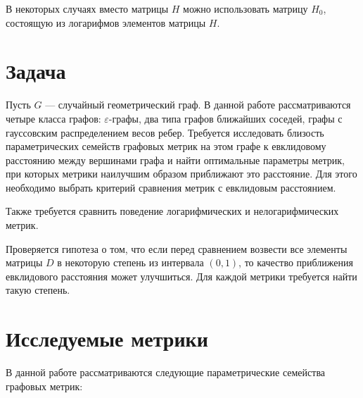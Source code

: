 В некоторых случаях вместо матрицы $H$ можно использовать матрицу $H_0$, состоящую из логарифмов элементов матрицы $H$.


\clearpage

\section{Задача} \label{sect1_2}

Пусть $G$ --- случайный геометрический граф. В данной работе рассматриваются четыре класса графов: $\varepsilon$-графы, два типа графов ближайших соседей, графы с гауссовским распределением весов ребер. Требуется исследовать близость параметрических семейств графовых метрик на этом графе к евклидовому расстоянию между вершинами графа и найти оптимальные параметры метрик, при которых метрики наилучшим образом приближают это расстояние. Для этого необходимо выбрать критерий сравнения метрик с евклидовым расстоянием.

Также требуется сравнить поведение логарифмических и нелогарифмических метрик.

Проверяется гипотеза о том, что если перед сравнением возвести все элементы матрицы $D$ в некоторую степень из интервала $(0,1)$, то качество приближения евклидового расстояния может улучшиться. Для каждой метрики требуется найти такую степень.

\clearpage

\section{Исследуемые метрики} \label{sect1_3}

В данной работе рассматриваются следующие параметрические семейства графовых метрик:


